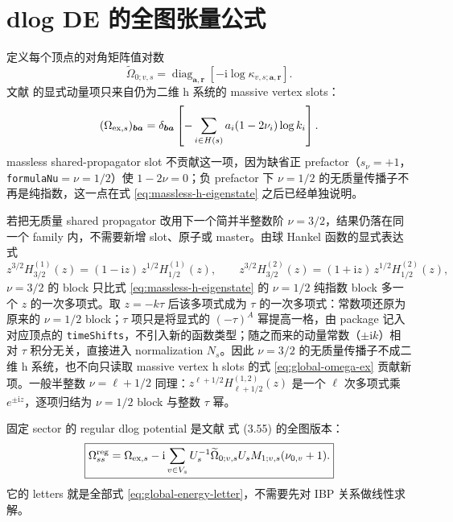 \documentclass[11pt,a4paper]{ctexart}
\newcommand{\ii}{\mathrm i}
\begin{document}
\section{dlog DE 的全图张量公式}
\label{sec:dlog-tensor}

定义每个顶点的对角矩阵值对数
\begin{equation}
 \widetilde\Omega_{0;v,s}
 =\operatorname{diag}_{\bm a,\bm r}
 \left[-\ii\log\kappa_{v,s;\bm a,\bm r}\right].
 \label{eq:global-omega0}
\end{equation}
文献 \cite{Chen:2023eic} 的显式动量项只来自仍为二维 h 系统的 massive vertex slots：
\begin{equation}
 (\Omega_{{\rm ex},s})_{\bm b\bm a}
 =\delta_{\bm b\bm a}
 \left[-\sum_{i\in H(s)}a_i(1-2\nu_i)\log k_i\right].
 \label{eq:global-omega-ex}
\end{equation}
massless shared-propagator slot 不贡献这一项，因为缺省正 prefactor（$s_\nu=+1$，\texttt{formulaNu}$=\nu=1/2$）使 $1-2\nu=0$；负 prefactor 下 $\nu=1/2$ 的无质量传播子不再是纯指数，这一点在式 \eqref{eq:massless-h-eigenstate} 之后已经单独说明。

若把无质量 shared propagator 改用下一个简并半整数阶 $\nu=3/2$，结果仍落在同一个 family 内，不需要新增 slot、原子或 master。由球 Hankel 函数的显式表达式
\begin{equation}
 z^{3/2}H^{(1)}_{3/2}(z)=(1-\ii z)\,z^{1/2}H^{(1)}_{1/2}(z),\qquad
 z^{3/2}H^{(2)}_{3/2}(z)=(1+\ii z)\,z^{1/2}H^{(2)}_{1/2}(z),
 \label{eq:half-integer-family-nu32}
\end{equation}
$\nu=3/2$ 的 block 只比式 \eqref{eq:massless-h-eigenstate} 的 $\nu=1/2$ 纯指数 block 多一个 $z$ 的一次多项式。取 $z=-k\tau$ 后该多项式成为 $\tau$ 的一次多项式：常数项还原为原来的 $\nu=1/2$ block；$\tau$ 项只是将显式的 $(-\tau)^A$ 幂提高一格，由 package 记入对应顶点的 \texttt{timeShifts}，不引入新的函数类型；随之而来的动量常数（$\pm\ii k$）相对 $\tau$ 积分无关，直接进入 normalization $N_s$。因此 $\nu=3/2$ 的无质量传播子不成二维 h 系统，也不向只读取 massive vertex h slots 的式 \eqref{eq:global-omega-ex} 贡献新项。一般半整数 $\nu=\ell+1/2$ 同理：$z^{\ell+1/2}H^{(1,2)}_{\ell+1/2}(z)$ 是一个 $\ell$ 次多项式乘 $e^{\pm\ii z}$，逐项归结为 $\nu=1/2$ block 与整数 $\tau$ 幂。

固定 sector 的 regular dlog potential 是文献 \cite{Chen:2023eic} 式 (3.55) 的全图版本：
\begin{equation}
 \boxed{
 \Omega_{ss}^{\rm reg}
 =\Omega_{{\rm ex},s}
 -\ii\sum_{v\in V_s}
 U_s^{-1}\widetilde\Omega_{0;v,s}U_s
 M_{1;v,s}(\nu_{0,v}+1).
 }
 \label{eq:global-diagonal-omega}
\end{equation}
它的 letters 就是全部式 \eqref{eq:global-energy-letter}，不需要先对 IBP 关系做线性求解。
\end{document}
